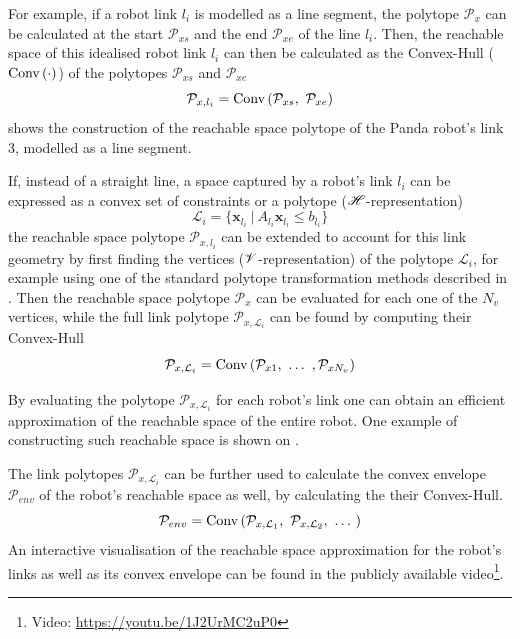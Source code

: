 For example, if a robot link $l_i$ is modelled as a line segment, the polytope $\mathcal{P}_x$ can be calculated at the start $\mathcal{P}_{xs}$ and the end $\mathcal{P}_{xe}$ of the line $l_i$. Then, the reachable space of this idealised robot link $l_i$ can then be calculated as the Convex-Hull ($\text{Conv}\left(\cdot\right)$) of the polytopes $\mathcal{P}_{xs}$ and $\mathcal{P}_{xe}$
\begin{equation}
    \mathcal{P}_{x,l_i} = \text{Conv}\left(  \mathcal{P}_{xs}, ~ \mathcal{P}_{xe}\right)
\end{equation}
 shows the construction of  the reachable space polytope of the Panda robot's link 3, modelled as a line segment.

If, instead of a straight line, a space captured by a robot's link $l_i$ can be expressed as a convex set of constraints or a polytope ($\mathscr{H}$-representation)
\begin{equation}
    \mathcal{L}_i = \Big \{ \bm{x}_{l_i} ~ |~ A_{l_i} \bm{x}_{l_i} \leq b_{l_i} \Big\}
\end{equation}
the reachable space polytope $\mathcal{P}_{x,l_i}$ can be extended to account for this link geometry by first finding the vertices ($\mathscr{V}$-representation) of the polytope $\mathcal{L}_i$, for example using one of the standard polytope transformation methods described in . Then the reachable space polytope $\mathcal{P}_{x}$ can be evaluated for each one of the $N_v$ vertices, while the full link polytope $\mathcal{P}_{x,\mathcal{L}_i}$ can be found by computing their Convex-Hull
\begin{equation}
    \mathcal{P}_{x,\mathcal{L}_i} = \text{Conv}\left(  \mathcal{P}_{x1}, ~ \dots ~, \mathcal{P}_{xN_v} \right)
\end{equation}

By evaluating the polytope $\mathcal{P}_{x,\mathcal{L}_i}$ for each robot's link one can obtain an efficient approximation of the reachable space of the entire robot. One example of constructing such reachable space is shown on .

The link polytopes $\mathcal{P}_{x,\mathcal{L}_i}$ can be further used to calculate the convex envelope $\mathcal{P}_{env}$ of the robot's reachable space as well, by calculating the their Convex-Hull.
\begin{equation}
    \mathcal{P}_{env} = \text{Conv}\left(  \mathcal{P}_{x,\mathcal{L}_1},~ \mathcal{P}_{x,\mathcal{L}_2}, ~ \dots ~ \right)
\end{equation}
An interactive visualisation of the reachable space approximation for the robot's links as well as its convex envelope can be found in the publicly available video\footnote{Video: \url{https://youtu.be/1J2UrMC2uP0}}.

